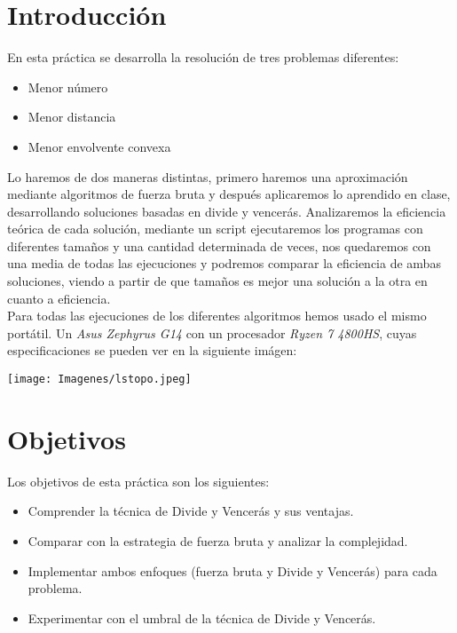 \documentclass[a4paper,12pt]{article}
\begin{document}

\tableofcontents

\newpage

\section{Introducción}
En esta práctica se desarrolla la resolución de tres problemas diferentes: 

\begin{itemize}
	\item Menor número
	\item Menor distancia
	\item Menor envolvente convexa
\end{itemize}

Lo haremos de dos maneras distintas, primero haremos una aproximación mediante algoritmos 
de fuerza bruta y después aplicaremos lo aprendido en clase, desarrollando soluciones basadas 
en divide y vencerás. Analizaremos la eficiencia teórica de cada solución, mediante un script
ejecutaremos los programas con diferentes tamaños y una cantidad determinada de veces, nos 
quedaremos con una media de todas las ejecuciones y podremos comparar la eficiencia de ambas 
soluciones, viendo a partir de que tamaños es mejor una solución a la otra en cuanto a eficiencia.
\\

Para todas las ejecuciones de los diferentes algoritmos hemos usado el mismo portátil. Un \textit{Asus Zephyrus G14} con un procesador \textit{Ryzen 7 4800HS}, cuyas especificaciones se pueden ver en la siguiente imágen:\\
\begin{center}
	\texttt{[image: Imagenes/lstopo.jpeg]}
\end{center}



\section{Objetivos}
Los objetivos de esta práctica son los siguientes:
\begin{itemize}
	\item Comprender la técnica de Divide y Vencerás y sus ventajas.
	\item Comparar con la estrategia de fuerza bruta y analizar la complejidad.
	\item Implementar ambos enfoques (fuerza bruta y Divide y Vencerás) para cada problema.
	\item Experimentar con el umbral de la técnica de Divide y Vencerás.
\end{itemize}
\end{document}
